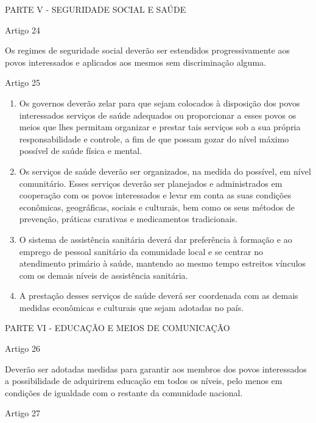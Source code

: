 \documentclass[
]{book}
\begin{document}
PARTE V - SEGURIDADE SOCIAL E SAÚDE

Artigo 24

Os regimes de seguridade social deverão ser estendidos progressivamente aos povos interessados e aplicados aos mesmos sem discriminação alguma.

Artigo 25

\begin{enumerate}
\def\labelenumi{\arabic{enumi}.}
\item
  Os governos deverão zelar para que sejam colocados à disposição dos povos interessados serviços de saúde adequados ou proporcionar a esses povos os meios que lhes permitam organizar e prestar tais serviços sob a sua própria responsabilidade e controle, a fim de que possam gozar do nível máximo possível de saúde física e mental.
\item
  Os serviços de saúde deverão ser organizados, na medida do possível, em nível comunitário. Esses serviços deverão ser planejados e administrados em cooperação com os povos interessados e levar em conta as suas condições econômicas, geográficas, sociais e culturais, bem como os seus métodos de prevenção, práticas curativas e medicamentos tradicionais.
\item
  O sistema de assistência sanitária deverá dar preferência à formação e ao emprego de pessoal sanitário da comunidade local e se centrar no atendimento primário à saúde, mantendo ao mesmo tempo estreitos vínculos com os demais níveis de assistência sanitária.
\item
  A prestação desses serviços de saúde deverá ser coordenada com as demais medidas econômicas e culturais que sejam adotadas no país.
\end{enumerate}

PARTE VI - EDUCAÇÃO E MEIOS DE COMUNICAÇÃO

Artigo 26

Deverão ser adotadas medidas para garantir aos membros dos povos interessados a possibilidade de adquirirem educação em todos os níveis, pelo menos em condições de igualdade com o restante da comunidade nacional.

Artigo 27
\end{document}
